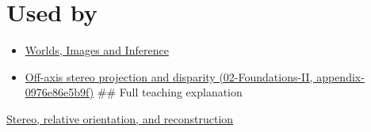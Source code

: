 \section{Used by}\label{appendix-c4e98b6e4001-used-by}

\begin{itemize}
\item
  \href{Continuous\%20Notes/University\%20-\%20Worlds,\%20Images\%20and\%20Inference\%20-\%20Graphics,\%20Vision\%20and\%20Photography}{Worlds, Images and Inference}
\item
  \href{../02-Foundations-II/main.pdf\#nameddest=appendix-0976e86e5b9f}{Off-axis stereo projection and disparity (02-Foundations-II, appendix-0976e86e5b9f)} \#\# Full teaching explanation
\end{itemize}

\href{Continuous\%20Notes/University\%20-\%20Worlds,\%20Images\%20and\%20Inference\%20-\%20Graphics,\%20Vision\%20and\%20Photography\#Stereo,\%20relative\%20orientation,\%20and\%20reconstruction}{Stereo, relative orientation, and reconstruction}
